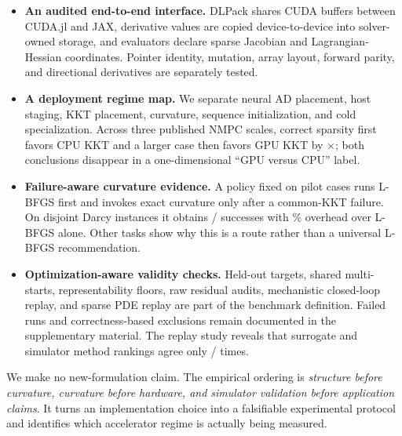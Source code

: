 \begin{itemize}
  \item \textbf{An audited end-to-end interface.}  DLPack shares CUDA buffers
  between CUDA.jl and JAX, derivative values are copied device-to-device into
  solver-owned storage, and evaluators declare sparse Jacobian and
  Lagrangian-Hessian coordinates.  Pointer identity, mutation, array layout,
  forward parity, and directional derivatives are separately tested.

  \item \textbf{A deployment regime map.}  We separate neural AD placement,
  host staging, KKT placement, curvature, sequence initialization, and cold
  specialization.  Across three published NMPC scales, correct sparsity first
  favors CPU KKT and a larger case then favors GPU KKT by
  \PFRCaseThreeSpeedup$\times$; both conclusions
  disappear in a one-dimensional ``GPU versus CPU'' label.

  \item \textbf{Failure-aware curvature evidence.}  A policy fixed on pilot
  cases runs L-BFGS first and invokes exact curvature only after a common-KKT
  failure.  On disjoint Darcy instances it obtains
  \DarcyRouteTotal/\DarcyRouteTotal{} successes with
  \DarcyRouteOverhead\% overhead over L-BFGS alone.  Other tasks show why this
  is a route rather than a universal L-BFGS recommendation.

  \item \textbf{Optimization-aware validity checks.}  Held-out targets,
  shared multi-starts, representability floors, raw residual audits,
  mechanistic closed-loop replay, and sparse PDE replay are part of the
  benchmark definition.  Failed runs and correctness-based exclusions remain
  documented in the supplementary material.  The
  replay study reveals that surrogate and simulator method rankings agree only
  \ReplayAgreement/\ReplayGroups{} times.
\end{itemize}

We make no new-formulation claim.  The empirical ordering is \emph{structure
before curvature, curvature before hardware, and simulator validation before
application claims}.  It turns an implementation
choice into a falsifiable experimental protocol and identifies which
accelerator regime is actually being measured.
